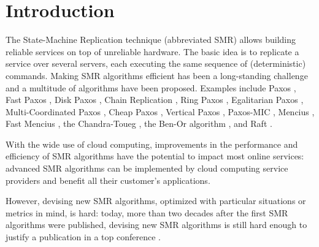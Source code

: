 \section{Introduction}

The State-Machine Replication technique (abbreviated SMR) allows
building reliable services on top of unreliable hardware. The basic idea is to 
replicate a service over several servers, each executing the same
sequence of (deterministic) commands. 
Making SMR algorithms efficient has been a long-standing
challenge and a multitude of algorithms have been proposed. Examples
include Paxos \cite{lamport2001paxos}, Fast Paxos \cite{Lamport06FastPaxos}, Disk Paxos
\cite{GafniLamport03DiskPaxos}, Chain Replication
\cite{RenesseSchneider04ChainReplicationSupportingHighThroughputAvailability},
Ring Paxos
\cite{MarandiETAL10RingPaxosHighthroughputAtomicBroadcastProtocol},
Egalitarian Paxos
\cite{MoraruAndersenKaminsky13ThereIsMoreConsensusEgalitarianParliaments},
Multi-Coordinated Paxos
\cite{CamargosSchmidtPedone07MulticoordinatedPaxos}, Cheap Paxos
\cite{LamportMassa04CheapPaxos}, Vertical Paxos
\cite{LamportMalkhiZhou09VerticalPaxosPrimarybackupReplication},
Paxos-MIC
\cite{HurfinMoiseNarzul11AdaptiveFastPaxosMakingQuickEverlasting},
Mencius
\cite{MaoJunqueiraMarzullo08MenciusBuildingEfficientReplicatedStateMachine},
Fast Mencius \cite{WeiETAL13FastMenciusMenciusLowCommitLatency}, the Chandra-Toueg \cite{ChandraToueg96UnreliableFailureDetectorsReliableDistributedSystems}, the Ben-Or algorithm \cite{BenOr83AnotherAdvantageFreeChoiceCompletelyAsynchronous}, and Raft \cite{OngaroOusterhout14SearchUnderstandableConsensusAlgorithm}.

With the wide use of cloud computing, improvements in the performance and efficiency of SMR algorithms have the potential to impact most online services: advanced SMR algorithms can be implemented by cloud computing service providers and benefit all their customer's applications.

However, devising new SMR algorithms, optimized with particular situations or metrics in mind, is hard: today, more than two decades after the first SMR algorithms \cite{Lamport98ParttimeParliament,BirmanJoseph87ReliableCommunicationPresenceFailures,OkiLiskov88ViewstampedReplicationGeneralPrimaryCopy,DworkLynchStockmeyer84ConsensusPresencePartialSynchronyPreliminaryVersion} were published, devising new SMR algorithms is still hard enough to justify a publication in a top conference \cite{MoraruAndersenKaminsky13ThereIsMoreConsensusEgalitarianParliaments,OngaroOusterhout14SearchUnderstandableConsensusAlgorithm}.

